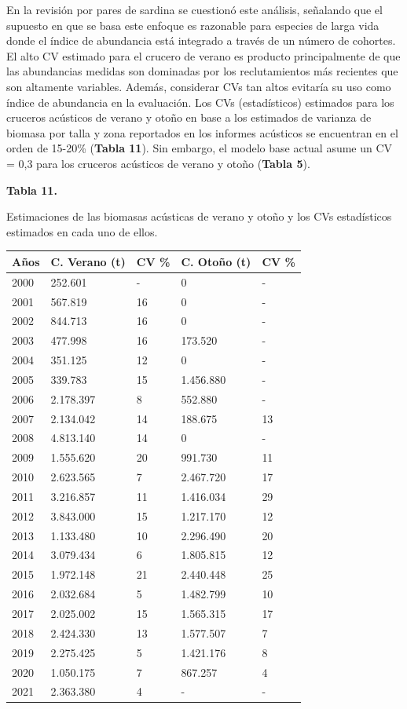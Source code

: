 \documentclass[
  spanish,
]{article}
\begin{document}
En la revisión por pares de sardina se cuestionó este análisis,
señalando que el supuesto en que se basa este enfoque es razonable para
especies de larga vida donde el índice de abundancia está integrado a
través de un número de cohortes. El alto CV estimado para el crucero de
verano es producto principalmente de que las abundancias medidas son
dominadas por los reclutamientos más recientes que son altamente
variables. Además, considerar CVs tan altos evitaría su uso como índice
de abundancia en la evaluación. Los CVs (estadísticos) estimados para
los cruceros acústicos de verano y otoño en base a los estimados de
varianza de biomasa por talla y zona reportados en los informes
acústicos se encuentran en el orden de 15-20\% (\textbf{Tabla 11}). Sin
embargo, el modelo base actual asume un CV = 0,3 para los cruceros
acústicos de verano y otoño (\textbf{Tabla 5}).

\small
\begin{center} 
\textbf{Tabla 11.}
\end{center}
\begin{center} 
\vspace{-0.2cm} Estimaciones de las biomasas acústicas de verano y otoño y los CVs estadísticos estimados en cada uno de ellos.
\end{center}
\vspace{-0.2cm}

\begin{longtable}[]{@{}lllll@{}}
\toprule
Años & C. Verano (t) & CV \% & C. Otoño (t) & CV \%\tabularnewline
\midrule
\endhead
2000 & 252.601 & - & 0 & -\tabularnewline
2001 & 567.819 & 16 & 0 & -\tabularnewline
2002 & 844.713 & 16 & 0 & -\tabularnewline
2003 & 477.998 & 16 & 173.520 & -\tabularnewline
2004 & 351.125 & 12 & 0 & -\tabularnewline
2005 & 339.783 & 15 & 1.456.880 & -\tabularnewline
2006 & 2.178.397 & 8 & 552.880 & -\tabularnewline
2007 & 2.134.042 & 14 & 188.675 & 13\tabularnewline
2008 & 4.813.140 & 14 & 0 & -\tabularnewline
2009 & 1.555.620 & 20 & 991.730 & 11\tabularnewline
2010 & 2.623.565 & 7 & 2.467.720 & 17\tabularnewline
2011 & 3.216.857 & 11 & 1.416.034 & 29\tabularnewline
2012 & 3.843.000 & 15 & 1.217.170 & 12\tabularnewline
2013 & 1.133.480 & 10 & 2.296.490 & 20\tabularnewline
2014 & 3.079.434 & 6 & 1.805.815 & 12\tabularnewline
2015 & 1.972.148 & 21 & 2.440.448 & 25\tabularnewline
2016 & 2.032.684 & 5 & 1.482.799 & 10\tabularnewline
2017 & 2.025.002 & 15 & 1.565.315 & 17\tabularnewline
2018 & 2.424.330 & 13 & 1.577.507 & 7\tabularnewline
2019 & 2.275.425 & 5 & 1.421.176 & 8\tabularnewline
2020 & 1.050.175 & 7 & 867.257 & 4\tabularnewline
2021 & 2.363.380 & 4 & - & -\tabularnewline
\bottomrule
\end{longtable}
\end{document}
